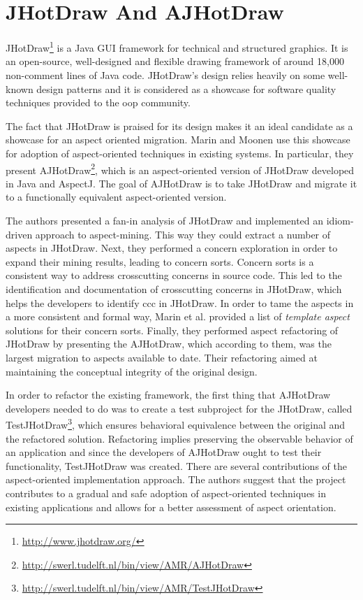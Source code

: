 \section{JHotDraw And AJHotDraw}\label{JHotDraw And AJHotDraw}
JHotDraw\footnote{\url{http://www.jhotdraw.org/}} is a Java GUI framework for technical and structured graphics. 
It is an open-source, well-designed and flexible drawing framework of around 18,000 non-comment lines of Java code. 
JHotDraw's  design relies heavily on some well-known design patterns\cite{gamma1995design} and it is considered as a showcase for software quality techniques provided to the \ac{oop} community. 

The fact that JHotDraw is praised for its design makes it an ideal candidate as a showcase for an aspect oriented migration. 
Marin and Moonen \cite{marinajhotdraw} use this showcase for adoption of aspect-oriented techniques in existing systems. 
In particular, they present AJHotDraw\footnote{\url{http://swerl.tudelft.nl/bin/view/AMR/AJHotDraw}}, which is an aspect-oriented version of JHotDraw developed in Java and AspectJ. 
The goal of AJHotDraw is to take JHotDraw and migrate it to a functionally equivalent aspect-oriented version. 

The authors presented a fan-in analysis of JHotDraw \cite{marin2004identifying} and implemented an idiom-driven approach to aspect-mining. 
This way they could extract a number of aspects in JHotDraw. 
Next, they performed a concern exploration in order to expand their mining results, leading to concern sorts.
Concern sorts is a consistent way to address crosscutting concerns in source code.
This led to the identification and documentation of crosscutting concerns in JHotDraw, which helps the developers to identify \ac{ccc} in JHotDraw.
In order to tame the aspects in a more consistent and formal way, Marin et al. provided a list of \textit{template aspect} solutions for their concern sorts.
Finally, they performed aspect refactoring of JHotDraw by presenting the AJHotDraw, which according to them, was the largest migration to aspects available to date.
Their refactoring aimed at maintaining the conceptual integrity of the original design.

In order to refactor the existing framework, the first thing that AJHotDraw developers needed to do was to create a test subproject for the JHotDraw, called TestJHotDraw\footnote{\url{http://swerl.tudelft.nl/bin/view/AMR/TestJHotDraw}}, which ensures behavioral equivalence between the original and the refactored solution. 
Refactoring implies preserving the observable behavior of an application\cite{fowler2009refactoring} and since the developers of AJHotDraw ought to test their functionality, TestJHotDraw was created. 
There are several contributions of the aspect-oriented implementation approach\cite{marinajhotdraw}. 
The authors suggest that the project contributes to a gradual and safe adoption of aspect-oriented techniques in existing applications and allows for a better assessment of aspect orientation.

